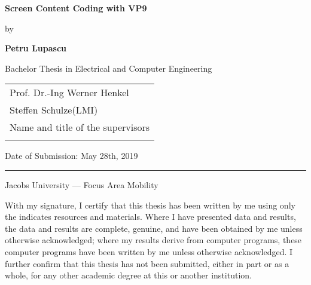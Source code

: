 \documentclass[a4paper,11pt,oneside]{article}
\newcommand{\myname}{Petru Lupascu}
\newcommand{\mytitle}{Screen Content Coding with VP9}
\newcommand{\mysupervisor}{Prof. Dr.-Ing Werner Henkel}
\newcommand{\myssupervisor}{Steffen Schulze(LMI)}
\begin{document}

  \thispagestyle{empty}

  \begin{flushright}
  \end{flushright}
  \vspace{20mm}
  \begin{center}
    \huge
    \textbf{\mytitle}
  \end{center}
  \vspace*{4mm}
  \begin{center}
   \Large by
  \end{center}
  \vspace*{4mm}
  \begin{center}
    \Large
    \textbf{\myname}
  \end{center}
  \vspace*{20mm}
  \begin{center}
    \large
    Bachelor Thesis in Electrical and Computer Engineering
  \end{center}
  \vfill
  \begin{flushright}
    \large
    \begin{tabular}{l}
      \mysupervisor\\
      \myssupervisor\\
      \hline
      Name and title of the supervisors \\
      \\
    \end{tabular}
  \end{flushright}
  \vspace*{8mm}
  \begin{flushleft}
    \large
    Date of Submission: May 28th, 2019 \\
    \rule{\textwidth}{1pt}
  \end{flushleft}
  \begin{center}
    \Large Jacobs University --- Focus Area Mobility
  \end{center}
  
  \iffalse

  \newpage
  \thispagestyle{empty}

  With my signature, I certify that this thesis has been written by me
  using only the indicates resources and materials. Where I have
  presented data and results, the data and results are complete,
  genuine, and have been obtained by me unless otherwise acknowledged;
  where my results derive from computer programs, these computer
  programs have been written by me unless otherwise acknowledged. I
  further confirm that this thesis has not been submitted, either in
  part or as a whole, for any other academic degree at this or another
  institution.
\end{document}
